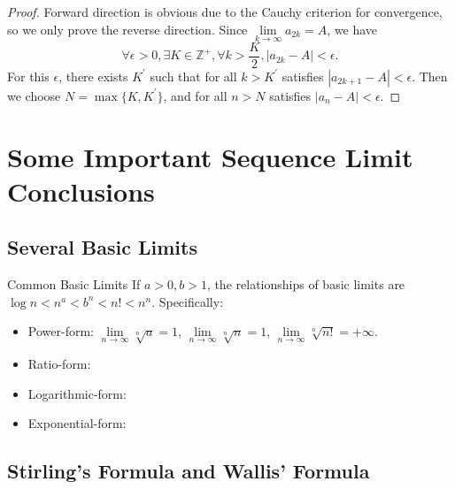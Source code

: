 \begin{proof}
  Forward direction is obvious due to the Cauchy criterion for convergence,
  so we only prove the reverse direction.
  Since $\lim \limits _{k \rightarrow \infty} a_{2k} = A$, we have
  \begin{equation}
    \forall \epsilon > 0, \exists K \in \mathbb{Z}^+, \forall k > \frac{K}{2}, |a_{2k} - A| < \epsilon.
  \end{equation}
  For this $\epsilon$, there exists $K^{\prime}$ such that for all $k >
  K^{\prime}$ satisfies $|a_{2k + 1} - A| < \epsilon$.
  Then we choose $N = \max \{K, K^{\prime}\}$, and for all $n > N$ satisfies
  $|a_n - A| < \epsilon$.
\end{proof}

\section{Some Important Sequence Limit Conclusions}

\subsection{Several Basic Limits}

\begin{proposition}{Common Basic Limits}{}
  If $a > 0, b > 1$, the relationships of basic limits are
  $\log n < n^a < b^n < n! < n^n$. Specifically:
  \begin{itemize}
  \item Power-form: $\lim \limits _{n \rightarrow \infty} \sqrt[n]{a} = 1$,
    $\lim \limits _{n \rightarrow \infty} \sqrt[n]{n} = 1$,
    $\lim \limits _{n \rightarrow \infty} \sqrt[n]{n!} = +\infty$.
  \item Ratio-form:
  \item Logarithmic-form:
  \item Exponential-form:
  \end{itemize}
\end{proposition}

\subsection{Stirling's Formula and Wallis' Formula}


